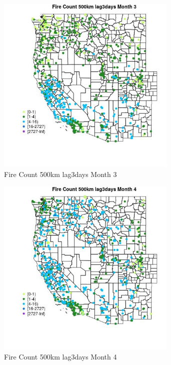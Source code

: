 \begin{figure} 
\centering  
\includegraphics[width=0.77\textwidth]{Code_Outputs/Report_ML_input_PM25_Step4_part_f_de_duplicated_aveswNAs_MapObsMo3Fire_Count_500km_lag3days.jpg} 
\caption{\label{fig:Report_ML_input_PM25_Step4_part_f_de_duplicated_aveswNAsMapObsMo3Fire_Count_500km_lag3days}Fire Count 500km lag3days Month 3} 
\end{figure} 
 

\begin{figure} 
\centering  
\includegraphics[width=0.77\textwidth]{Code_Outputs/Report_ML_input_PM25_Step4_part_f_de_duplicated_aveswNAs_MapObsMo4Fire_Count_500km_lag3days.jpg} 
\caption{\label{fig:Report_ML_input_PM25_Step4_part_f_de_duplicated_aveswNAsMapObsMo4Fire_Count_500km_lag3days}Fire Count 500km lag3days Month 4} 
\end{figure} 
 

